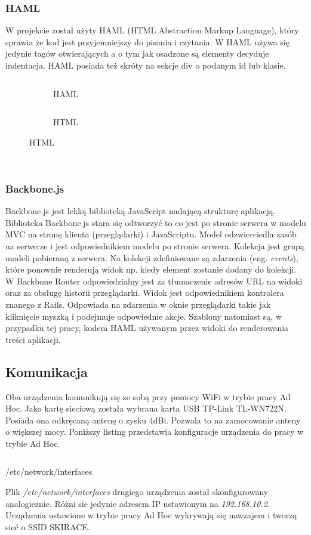 \documentclass[11pt,a4paper, twoside]{article}
\begin{document}
\subsubsection{HAML}
W projekcie został użyty HAML (HTML Abstraction Markup Language), który sprawia że kod jest przyjemniejszy do pisania i czytania. W HAML używa się jedynie tagów otwierających a o tym jak osadzone są elementy decyduje indentacja. HAML posiada też skróty na sekcje div o podanym id lub klasie.
\begin{figure}[H]
\centering
\begin{subfigure}[t]{0.45\textwidth}
\caption{HAML}
\begin{listing}[H]
\inputminted[linenos=true]{haml}{./src/example.haml}
\end{listing}
\end{subfigure}
\begin{subfigure}[t]{0.45\textwidth}
\caption{HTML}
\begin{listing}[H]
\inputminted{html}{./src/example.html}
\end{listing}
\end{subfigure}
\end{figure}
$\label{haml}$
\subsubsection{Backbone.js}
Backbone.js jest lekką biblioteką JavaScript nadającą strukturę aplikacją.
Biblioteka Backbone.js stara się odtworzyć to co jest po stronie serwera w modelu MVC na stronę klienta (przeglądarki) i JavaScriptu. Model odzwierciedla zasób na serwerze i jest odpowiednikiem modelu po stronie serwera. Kolekcja jest grupą modeli pobieraną z serwera. Na kolekcji zdefiniowane są zdarzenia (eng. \emph{events}), które ponownie renderują widok np. kiedy element zostanie dodany do kolekcji. W Backbone Router odpowiedzialny jest za tłumaczenie adresów URL na widoki oraz za obsługę historii przeglądarki. Widok jest odpowiednikiem kontrolera znanego z Rails. Odpowiada na zdarzenia w oknie przeglądarki takie jak kliknięcie myszką i podejmuje odpowiednie akcje. Szablony natomiast są, w przypadku tej pracy, kodem HAML używanym przez widoki do renderowania treści aplikacji.
\subsection{Komunikacja}
Oba urządzenia komunikują się ze sobą przy pomocy WiFi w trybie pracy Ad Hoc. Jako kartę sieciową została wybrana karta USB TP-Link \mbox{TL-WN722N}. Posiada ona odkręcaną antenę o zysku 4dBi. Pozwala to na zamocowanie anteny o większej mocy. Poniższy listing przedstawia konfiguracje urządzenia do pracy w trybie Ad Hoc.
\begin{listing}[H]
\inputminted[linenos=true]{sh}{./src/adhoc}
\caption{/etc/network/interfaces}
\end{listing}
Plik \emph{/etc/network/interfaces} drugiego urządzenia został skonfigurowany analogicznie. Różni sie jedynie adresem IP ustawionym na \emph{192.168.10.2}. Urządzenia ustawione w trybie pracy Ad Hoc wykrywają się nawzajem i tworzą sieć o SSID SKIRACE.
\newpage
\end{document}

